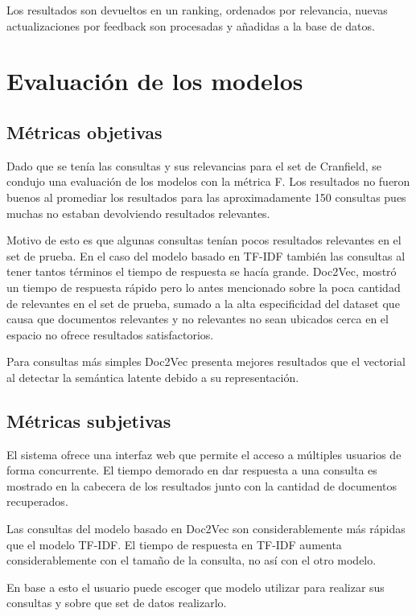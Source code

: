 \documentclass[12pt]{llncs}
\begin{document}
Los resultados son devueltos en un ranking, ordenados por relevancia, nuevas actualizaciones por feedback son procesadas y añadidas a la base de datos.

\section{Evaluación de los modelos}

\subsection{Métricas objetivas}

Dado que se tenía las consultas y sus relevancias para el set de Cranfield, se condujo una evaluación de los modelos con la métrica F. Los resultados no fueron buenos al promediar los resultados para las aproximadamente 150 consultas pues muchas no estaban devolviendo resultados relevantes.

Motivo de esto es que algunas consultas tenían pocos resultados relevantes en el set de prueba. En el caso del modelo basado en TF-IDF también las consultas al tener tantos términos el tiempo de respuesta se hacía grande. Doc2Vec, mostró un tiempo de respuesta rápido pero lo antes mencionado sobre la poca cantidad de relevantes en el set de prueba, sumado a la alta especificidad del dataset que causa que documentos relevantes y no relevantes no sean ubicados cerca en el espacio no ofrece resultados satisfactorios.

Para consultas más simples Doc2Vec presenta mejores resultados que el vectorial al detectar la semántica latente debido a su representación.


\subsection{Métricas subjetivas}

El sistema ofrece una interfaz web que permite el acceso a múltiples usuarios de forma concurrente. El tiempo demorado en dar respuesta a una consulta es mostrado en la cabecera de los resultados junto con la cantidad de documentos recuperados.

Las consultas del modelo basado en Doc2Vec son considerablemente más rápidas que el modelo TF-IDF. El tiempo de respuesta en TF-IDF aumenta considerablemente con el tamaño de la consulta, no así con el otro modelo.

En base a esto el usuario puede escoger que modelo utilizar para realizar sus consultas y sobre que set de datos realizarlo.
\end{document}
